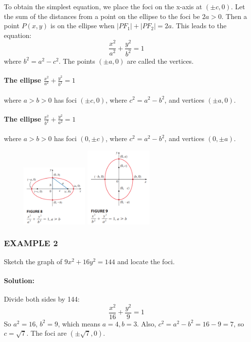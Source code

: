 \documentclass{article}
\begin{document}
To obtain the simplest equation, we place the foci on the x-axis at $(\pm c, 0)$. Let the sum of the distances from a point on the ellipse to the foci be $2a > 0$. Then a point $P(x,y)$ is on the ellipse when $|PF_1| + |PF_2| = 2a$. This leads to the equation:
\[
\frac{x^2}{a^2} + \frac{y^2}{b^2} = 1
\]
where $b^2 = a^2 - c^2$. The points $(\pm a,0)$ are called the vertices.

\paragraph{The ellipse $\frac{x^2}{a^2} + \frac{y^2}{b^2} = 1$} where $a > b > 0$ has foci $(\pm c, 0)$, where $c^2 = a^2 - b^2$, and vertices $(\pm a, 0)$.

\paragraph{The ellipse $\frac{x^2}{b^2} + \frac{y^2}{a^2} = 1$} where $a > b > 0$ has foci $(0, \pm c)$, where $c^2 = a^2 - b^2$, and vertices $(0, \pm a)$.
\begin{figure}[htbp]
    \centering
    \includegraphics[width=0.3\textwidth]{graph 55.png}
    \includegraphics[width=0.3\textwidth]{graph54.png}
\end{figure}
\subsubsection*{EXAMPLE 2}
Sketch the graph of $9x^2 + 16y^2 = 144$ and locate the foci.

\paragraph{Solution:} Divide both sides by 144:
\[
\frac{x^2}{16} + \frac{y^2}{9} = 1
\]
So $a^2 = 16$, $b^2 = 9$, which means $a=4, b=3$. Also, $c^2 = a^2 - b^2 = 16 - 9 = 7$, so $c = \sqrt{7}$. The foci are $(\pm\sqrt{7}, 0)$.
\end{document}

